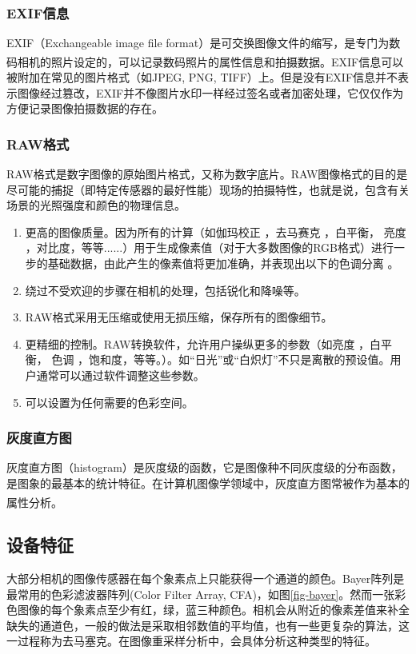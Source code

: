 \documentclass[a4paper, 10pt, notitlepage]{report}
\newcommand{\supercite}[1]{\textsuperscript{\cite{#1}}}
\begin{document}
			\subsubsection{EXIF信息}
				EXIF（Exchangeable image file format）是可交换图像文件的缩写，是专门为数码相机的照片设定的，可以记录数码照片的属性信息和拍摄数据\supercite{alvarez2004using}。EXIF信息可以被附加在常见的图片格式（如JPEG, PNG, TIFF）上。但是没有EXIF信息并不表示图像经过篡改，EXIF并不像图片水印一样经过签名或者加密处理，它仅仅作为方便记录图像拍摄数据的存在。

			\subsubsection{RAW格式}
				RAW格式是数字图像的原始图片格式，又称为数字底片。RAW图像格式的目的是尽可能的捕捉（即特定传感器的最好性能）现场的拍摄特性，也就是说，包含有关场景的光照强度和颜色的物理信息。
				\begin{enumerate}\setlength{\itemsep}{-0.1cm}
					\item 更高的图像质量。因为所有的计算（如伽玛校正 ，去马赛克 ，白平衡， 亮度 ，对比度，等等......）用于生成像素值（对于大多数图像的RGB格式）进行一步的基础数据，由此产生的像素值将更加准确，并表现出以下的色调分离 。
					\item 绕过不受欢迎的步骤在相机的处理，包括锐化和降噪等。
					\item RAW格式采用无压缩或使用无损压缩，保存所有的图像细节。
					\item 更精细的控制。RAW转换软件，允许用户操纵更多的参数（如亮度 ，白平衡， 色调 ，饱和度，等等。）。如“日光”或“白炽灯”不只是离散的预设值。用户通常可以通过软件调整这些参数。
					\item 可以设置为任何需要的色彩空间。
				\end{enumerate}
				

			\subsubsection{灰度直方图}
				灰度直方图（histogram）是灰度级的函数，它是图像种不同灰度级的分布函数，是图象的最基本的统计特征。在计算机图像学领域中，灰度直方图常被作为基本的属性分析\supercite{kapur1985new}。

		\subsection{设备特征}
			大部分相机的图像传感器在每个象素点上只能获得一个通道的颜色。Bayer阵列是最常用的色彩滤波器阵列(Color Filter Array, CFA)，如图\ref{fig-bayer}。然而一张彩色图像的每个象素点至少有红，绿，蓝三种颜色。相机会从附近的像素差值来补全缺失的通道色，一般的做法是采取相邻数值的平均值，也有一些更复杂的算法，这一过程称为去马塞克。在图像重采样分析中，会具体分析这种类型的特征。
\end{document}
